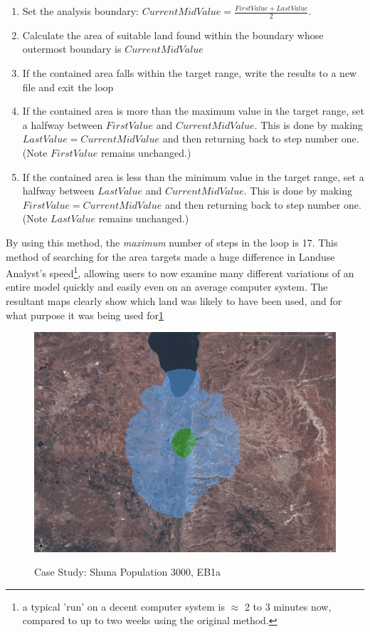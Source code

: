   \begin{enumerate} 
  
  \item Set the analysis boundary: $CurrentMidValue=\frac{FirstValue +
  LastValue}{2}$.  
  
  \item Calculate the area of suitable land found within the boundary whose
  outermost boundary is $CurrentMidValue$ 
  
  \item If the contained area falls within the target range, write the results
  to a new file and exit the loop 
  
  \item If the contained area is more than the maximum value in the target
  range, set a halfway between $FirstValue$ and $CurrentMidValue$. This is done
  by making $LastValue=CurrentMidValue$ and then returning back to step number
  one.  (Note $FirstValue$ remains unchanged.) 
  
  \item If the contained area is less than the minimum value in the target
  range, set a halfway between $LastValue$ and $CurrentMidValue$. This is done
  by making $FirstValue=CurrentMidValue$ and then returning back to step number
  one.  (Note $LastValue$ remains unchanged.) 
  
  \end{enumerate}

By using this method, the \textit{maximum} number of steps in the loop is 17.
This method of searching for the area targets made a huge difference in Landuse
Analyst's speed\footnote{ a typical 'run' on a decent computer system is
$\approx$ 2 to 3 minutes now, compared to up to two weeks using the original
method.}, allowing users to now examine many different variations of an entire
model quickly and easily even on an average computer system.  The resultant
maps clearly show which land was likely to have been used, and for what purpose
it was being used for\ref{fig:caseStudy}
 
  \begin{figure}[htbp] %
  \includegraphics[scale=0.225]{./images/LEB130007030FallowSlope.jpg}
  \label{fig:caseStudy} \caption{Case Study: Shuna  Population 3000, EB1a}
  \end{figure}

